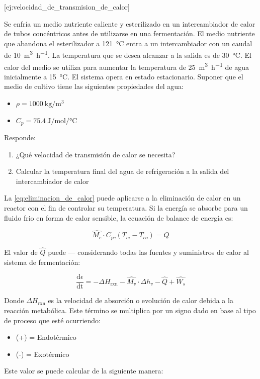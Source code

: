 \documentclass{AsignaturaResumen}
\begin{document}
[ej:velocidad_de_transmision_de_calor]{
    Se enfría un medio nutriente caliente y esterilizado en un intercambiador de calor de tubos concéntricos antes de utilizarse en una fermentación. El medio nutriente que abandona el esterilizador a \qty{121}{\degreeCelsius} entra a un intercambiador con un caudal de \qty{10}{\m\cubed\per\hour}. La temperatura que se desea alcanzar a la salida es de \qty{30}{\degreeCelsius}. El calor del medio se utiliza para aumentar la temperatura de \qty{25}{\m\cubed\per\hour} de agua inicialmente a \qty{15}{\degreeCelsius}. El sistema opera en estado estacionario. Suponer que el medio de cultivo tiene las siguientes propiedades del agua:
    \begin{itemize}
        \item $\rho = \qty{1000}{\kg\per\m\cubed}$
        \item $C_{p} = \qty{75.4}{\J\per\mole\per\degreeCelsius}$
    \end{itemize}
    Responde:
    \begin{enumerate}
        \item ¿Qué velocidad de transmisión de calor se necesita?
        \item Calcular la temperatura final del agua de refrigeración a la salida del intercambiador de calor
    \end{enumerate}
}

La \autoref{eq:eliminacion_de_calor} puede aplicarse a la eliminación de calor en un reactor con el fin de controlar su temperatura. Si la energía se absorbe para un fluido frio en forma de calor sensible, la ecuación de balance de energía es:

\begin{equation}
    \hat{M_{c}} \cdot C_{pc} (T_{ci} - T_{co}) = \hat{Q}
\end{equation}

El valor de $\hat{Q}$ puede --- considerando todas las fuentes y suministros de calor al sistema de fermentación:

\begin{equation}\label{eq:q_en_estado_estacionario}
    \frac{\mathrm{d}\epsilon}{\mathrm{dt}} = -\Delta H_{\mathrm{rxn}} - \hat{M_{v}} \cdot \Delta h_{v} - \hat{Q} + \hat{W_{s}}
\end{equation}

Donde $\Delta H_{\mathrm{rxn}}$ es la velocidad de absorción o evolución de calor debida a la reacción metabólica. Este término se multiplica por un signo dado en base al tipo de proceso que esté ocurriendo:
    \begin{itemize}
        \item (+) = Endotérmico
        \item (-) = Exotérmico
    \end{itemize}
    Este valor se puede calcular de la siguiente manera:
\end{document}
